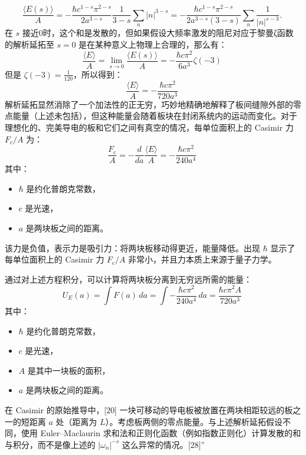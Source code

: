\[
\frac{\langle E(s)\rangle}{A} = - \frac{\hbar c^{1-s} \pi^{2-s}}{2a^{3-s}} \frac{1}{3-s} \sum_{n} |n|^{3-s} = - \frac{\hbar c^{1-s} \pi^{2-s}}{2a^{3-s}(3-s)} \sum_{n} \frac{1}{|n|^{s-3}}.~
\]
在 \(s\) 接近0时，这个和是发散的，但如果假设大频率激发的阻尼对应于黎曼ζ函数的解析延拓至 \(s = 0\) 是在某种意义上物理上合理的，那么有：
\[
\frac{\langle E\rangle}{A} = \lim_{s \to 0} \frac{\langle E(s)\rangle}{A} = -\frac{\hbar c \pi^2}{6a^3} \zeta(-3)~
\]
但是 \(\zeta(-3) = \frac{1}{120}\)，所以得到：
\[
\frac{\langle E\rangle}{A} = -\frac{\hbar c \pi^2}{720 a^3}~
\]
解析延拓显然消除了一个加法性的正无穷，巧妙地精确地解释了板间缝隙外部的零点能量（上述未包括），但这种能量会随着板块在封闭系统内的运动而变化。对于理想化的、完美导电的板和它们之间有真空的情况，每单位面积上的 Casimir 力 \( F_c / A \) 为：
\[
\frac{F_{\mathrm{c}}}{A} = -\frac{d}{da} \frac{\langle E \rangle}{A} = -\frac{\hbar c \pi^2}{240 a^4}~
\]
其中：
\begin{itemize}
\item \(\hbar\) 是约化普朗克常数，
\item \(c\) 是光速，
\item \(a\) 是两块板之间的距离。
\end{itemize}

该力是负值，表示力是吸引力：将两块板移动得更近，能量降低。出现 \(\hbar\) 显示了每单位面积上的 Casimir 力 \( F_c / A \) 非常小，并且力本质上来源于量子力学。

通过对上述方程积分，可以计算将两块板分离到无穷远所需的能量：
\[
U_E(a) = \int F(a) \, da = \int -\frac{\hbar c \pi^2}{240 a^4} \, da = \frac{\hbar c \pi^2 A}{720 a^3}~
\]
其中：
\begin{itemize}
\item \(\hbar\) 是约化普朗克常数，
\item \(c\) 是光速，
\item \(A\) 是其中一块板的面积，
\item \(a\) 是两块板之间的距离。
\end{itemize}
在 Casimir 的原始推导中，[20] 一块可移动的导电板被放置在两块相距较远的板之一的短距离 \(a\) 处（距离为 \(L\)）。考虑板两侧的零点能量。与上述解析延拓假设不同，使用 Euler–Maclaurin 求和法和正则化函数（例如指数正则化）计算发散的和与积分，而不是像上述的 \(|\omega_n|^{-s}\) 这么异常的情况。[28]”